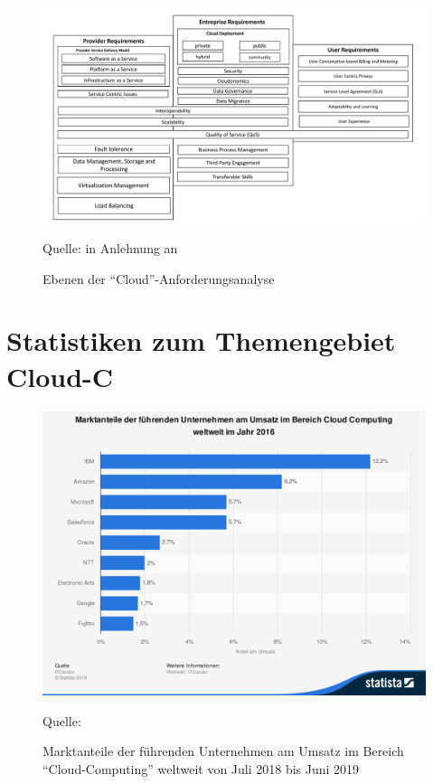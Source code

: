\clearpage
\begin{figure}[H]
	\centering
	\includegraphics[scale=0.50, angle=90]{img/cloudreq.pdf}
	\caption{Ebenen der \enquote{Cloud}-Anforderungsanalyse}
	{\footnotesize Quelle: in Anlehnung an \cite{rimal_architectural_2011}}
	\label{abb:cloudreq}
\end{figure}

\clearpage
\section{Statistiken zum Themengebiet \ac{Cloud-C}}

\begin{figure}[H]
	\centering
	\includegraphics[scale=0.43]{img/statistic_id150979_marktanteile-der-fuehrenden-unternehmen-im-bereich-cloud-computing-weltweit-2019.pdf}
	\caption{Marktanteile der führenden Unternehmen am Umsatz im Bereich \enquote{Cloud-Computing} weltweit von Juli 2018 bis Juni 2019}
	{\footnotesize Quelle: \cite{itcandor_cloud_2019}}
	\label{abb:marktanteileCC19}
\end{figure}

